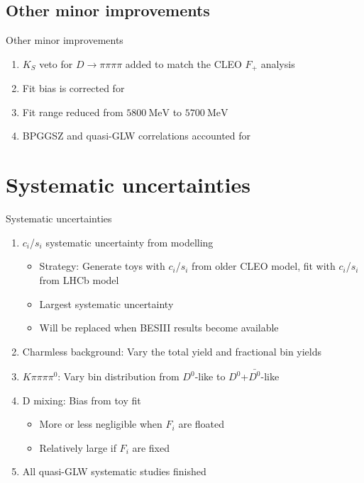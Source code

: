 \documentclass{beamer}
\begin{document}
\subsection{Other minor improvements}
\begin{frame}{Other minor improvements}
  \begin{enumerate}
    \setlength\itemsep{1.5em}
    \item{$K_S$ veto for $D\to\pi\pi\pi\pi$ added to match the CLEO $F_+$ analysis}
    \item{Fit bias is corrected for}
    \item{Fit range reduced from $\SI{5800}{\mega\eV}$ to $\SI{5700}{\mega\eV}$}
    \item{BPGGSZ and quasi-GLW correlations accounted for}
  \end{enumerate}
\end{frame}

\section{Systematic uncertainties}
\begin{frame}{Systematic uncertainties}
  \begin{enumerate}
    \setlength\itemsep{1.0em}
    \item{$c_i$/$s_i$ systematic uncertainty from modelling}
    \begin{itemize}
      \item{Strategy: Generate toys with $c_i$/$s_i$ from older CLEO model, fit with $c_i$/$s_i$ from LHCb model}
      \item{Largest systematic uncertainty}
      \item{Will be replaced when BESIII results become available}
    \end{itemize}
    \item{Charmless background: Vary the total yield and fractional bin yields}
    \item{$K\pi\pi\pi\pi^0$: Vary bin distribution from $D^0$-like to $D^0$+$\bar{D^0}$-like}
    \item{D mixing: Bias from toy fit}
    \begin{itemize}
      \item{More or less negligible when $F_i$ are floated}
      \item{Relatively large if $F_i$ are fixed}
    \end{itemize}
    \item{All quasi-GLW systematic studies finished}
  \end{enumerate}
\end{frame}
\end{document}
